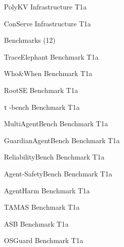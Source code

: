 \begin{flushleft}
 PolyKV Infrastructure T1a\par
{} ConServe Infrastructure T1a\par
\noindent  Benchmarks (12)\par
{} TraceElephant Benchmark T1a\par
{} Who\&When Benchmark T1a\par
{} RootSE Benchmark T1a\par
{} τ -bench Benchmark T1a\par
{} MultiAgentBench Benchmark T1a\par
{} GuardianAgentBench Benchmark T1a\par
{} ReliabilityBench Benchmark T1a\par
{} Agent-SafetyBench Benchmark T1a\par
{} AgentHarm Benchmark T1a\par
{} TAMAS Benchmark T1a\par
{} ASB Benchmark T1a\par
{} OSGuard Benchmark T1a\par
\end{flushleft}
